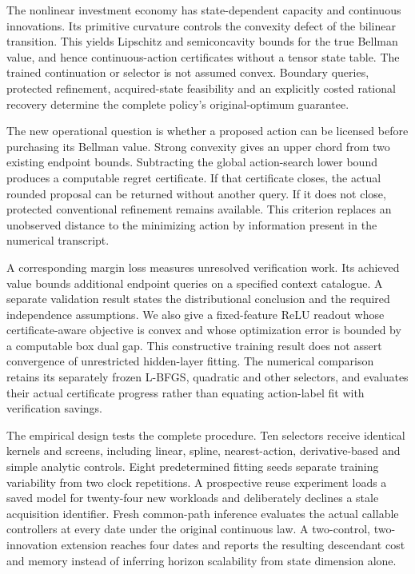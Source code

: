 \documentclass[ecta,nameyear,draft]{econsocart}
\begin{document}
The nonlinear investment economy has state-dependent capacity and continuous innovations. Its primitive curvature controls the convexity defect of the bilinear transition. This yields Lipschitz and semiconcavity bounds for the true Bellman value, and hence continuous-action certificates without a tensor state table. The trained continuation or selector is not assumed convex. Boundary queries, protected refinement, acquired-state feasibility and an explicitly costed rational recovery determine the complete policy's original-optimum guarantee.

The new operational question is whether a proposed action can be licensed before purchasing its Bellman value. Strong convexity gives an upper chord from two existing endpoint bounds. Subtracting the global action-search lower bound produces a computable regret certificate. If that certificate closes, the actual rounded proposal can be returned without another query. If it does not close, protected conventional refinement remains available. This criterion replaces an unobserved distance to the minimizing action by information present in the numerical transcript.

A corresponding margin loss measures unresolved verification work. Its achieved value bounds additional endpoint queries on a specified context catalogue. A separate validation result states the distributional conclusion and the required independence assumptions. We also give a fixed-feature ReLU readout whose certificate-aware objective is convex and whose optimization error is bounded by a computable box dual gap. This constructive training result does not assert convergence of unrestricted hidden-layer fitting. The numerical comparison retains its separately frozen L-BFGS, quadratic and other selectors, and evaluates their actual certificate progress rather than equating action-label fit with verification savings.

The empirical design tests the complete procedure. Ten selectors receive identical kernels and screens, including linear, spline, nearest-action, derivative-based and simple analytic controls. Eight predetermined fitting seeds separate training variability from two clock repetitions. A prospective reuse experiment loads a saved model for twenty-four new workloads and deliberately declines a stale acquisition identifier. Fresh common-path inference evaluates the actual callable controllers at every date under the original continuous law. A two-control, two-innovation extension reaches four dates and reports the resulting descendant cost and memory instead of inferring horizon scalability from state dimension alone.
\end{document}
